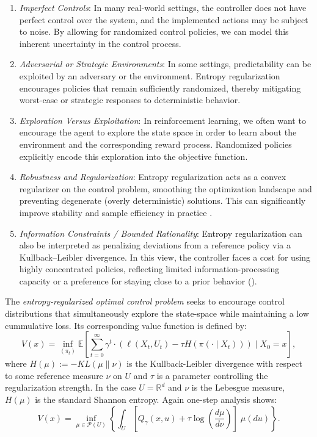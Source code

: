 \documentclass[11pt,oneside,reqno]{article}
\theoremstyle{plain}
\theoremstyle{definition}
\numberwithin{equation}{section}
\renewcommand{\cite}{\citet}
\newcommand{\R}{\mathbb{R}}
\newcommand{\E}{\mathbb{E}}
\begin{document}
\begin{enumerate}[label=(\roman*)]
    \item \textit{Imperfect Controls}: In many real-world settings, the controller does not have perfect control over the system, and the implemented actions may be subject to noise. By allowing for randomized control policies, we can model this inherent uncertainty in the control process.

    \item \textit{Adversarial or Strategic Environments}: In some settings, predictability can be exploited by an adversary or the environment. Entropy regularization encourages policies that remain sufficiently randomized, thereby mitigating worst-case or strategic responses to deterministic behavior.

    \item \textit{Exploration Versus Exploitation}: In reinforcement learning, we often want to encourage the agent to explore the state space in order to learn about the environment and the corresponding reward process. Randomized policies explicitly encode this exploration into the objective function.

    \item \textit{Robustness and Regularization}: Entropy regularization acts as a convex regularizer on the control problem, smoothing the optimization landscape and preventing degenerate (overly deterministic) solutions. This can significantly improve stability and sample efficiency in practice \cite{haarnoja2018softactorcriticoffpolicymaximum}.

    \item \textit{Information Constraints / Bounded Rationality}: Entropy regularization can also be interpreted as penalizing deviations from a reference policy via a Kullback--Leibler divergence. In this view, the controller faces a cost for using highly concentrated policies, reflecting limited information-processing capacity or a preference for staying close to a prior behavior (\cite{ortega2015informationtheoreticboundedrationality}). 
\end{enumerate}

The \textit{entropy-regularized optimal control problem} seeks to encourage control distributions
that simultaneously explore the state-space while maintaining a low cummulative loss. Its corresponding value function is defined by:
%
\[V(x) = \inf_{(\pi_t)} \E\left[ \sum_{t=0}^\infty \gamma^t \cdot (\ell(X_t, U_t) - \tau H(\pi(\cdot \mid X_t)))\;\bigg\vert\; X_0 = x\right],\]
%
where $H(\mu) := -KL(\mu \parallel \nu)$ is the Kullback-Leibler divergence with respect to some reference measure $\nu$ on $U$ and $\tau$ is a parameter controlling the regularization strength. In the case 
$U = \R^d$ and $\nu$ is the Lebesgue measure, $H(\mu)$ is the standard Shannon entropy. 
Again one-step analysis shows:
%
\begin{equation}
	V(x) = \inf_{\mu \in \mathcal{P}(U)} \left\{\int_U \left[Q_\gamma(x,u) + \tau \log\left(\frac{d\mu}{d\nu}\right)\right] \; \mu(du)  \right\}.
	\label{eqn:entropy_regularized_bellman_eqn}
\end{equation}
\end{document}
